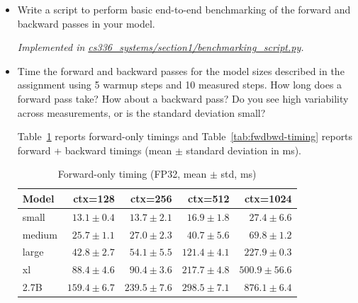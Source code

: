\documentclass[letterpaper]{article}
\newcommand{\repofile}[2]{\href{https://github.com/echung32/ece405-assignment4-hpc/blob/main/#1}{#2}}
\begin{document}
	\begin{itemize}
		\item[(a)] Write a script to perform basic end-to-end benchmarking of the forward and backward passes in your model.
		
		\textit{Implemented in \repofile{cs336_systems/section1/benchmarking_script.py}{cs336\_systems/section1/benchmarking\_script.py}.}
		
		\item[(b)] Time the forward and backward passes for the model sizes described in the assignment using 5 warmup steps and 10 measured steps. How long does a forward pass take? How about a backward pass? Do you see high variability across measurements, or is the standard deviation small?
		
		Table~\ref{tab:fwd-timing} reports forward-only timings and Table~\ref{tab:fwdbwd-timing} reports forward + backward timings (mean $\pm$ standard deviation in ms).
		
		\begin{table}[H]
			\centering
			\caption{Forward-only timing (FP32, mean $\pm$ std, ms)}
			\label{tab:fwd-timing}
			\begin{tabular}{lrrrr}
				\hline
				Model & ctx=128 & ctx=256 & ctx=512 & ctx=1024 \\
				\hline
				small  & $13.1 \pm 0.4$  & $13.7 \pm 2.1$  & $16.9 \pm 1.8$  & $27.4 \pm 6.6$ \\
				medium & $25.7 \pm 1.1$  & $27.0 \pm 2.3$  & $40.7 \pm 5.6$  & $69.8 \pm 1.2$ \\
				large  & $42.8 \pm 2.7$  & $54.1 \pm 5.5$  & $121.4 \pm 4.1$ & $227.9 \pm 0.3$ \\
				xl     & $88.4 \pm 4.6$  & $90.4 \pm 3.6$  & $217.7 \pm 4.8$ & $500.9 \pm 56.6$ \\
				2.7B   & $159.4 \pm 6.7$ & $239.5 \pm 7.6$ & $298.5 \pm 7.1$ & $876.1 \pm 6.4$ \\
				\hline
			\end{tabular}
		\end{table}
		

\end{itemize}
\end{document}
